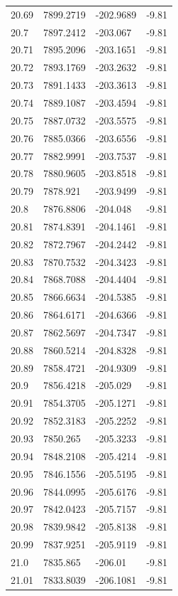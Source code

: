 \begin{table}[H]
\begin{tabular}{llll}
20.69 & 7899.2719 & -202.9689 & -9.81 \\
20.7 & 7897.2412 & -203.067 & -9.81 \\
20.71 & 7895.2096 & -203.1651 & -9.81 \\
20.72 & 7893.1769 & -203.2632 & -9.81 \\
20.73 & 7891.1433 & -203.3613 & -9.81 \\
20.74 & 7889.1087 & -203.4594 & -9.81 \\
20.75 & 7887.0732 & -203.5575 & -9.81 \\
20.76 & 7885.0366 & -203.6556 & -9.81 \\
20.77 & 7882.9991 & -203.7537 & -9.81 \\
20.78 & 7880.9605 & -203.8518 & -9.81 \\
20.79 & 7878.921 & -203.9499 & -9.81 \\
20.8 & 7876.8806 & -204.048 & -9.81 \\
20.81 & 7874.8391 & -204.1461 & -9.81 \\
20.82 & 7872.7967 & -204.2442 & -9.81 \\
20.83 & 7870.7532 & -204.3423 & -9.81 \\
20.84 & 7868.7088 & -204.4404 & -9.81 \\
20.85 & 7866.6634 & -204.5385 & -9.81 \\
20.86 & 7864.6171 & -204.6366 & -9.81 \\
20.87 & 7862.5697 & -204.7347 & -9.81 \\
20.88 & 7860.5214 & -204.8328 & -9.81 \\
20.89 & 7858.4721 & -204.9309 & -9.81 \\
20.9 & 7856.4218 & -205.029 & -9.81 \\
20.91 & 7854.3705 & -205.1271 & -9.81 \\
20.92 & 7852.3183 & -205.2252 & -9.81 \\
20.93 & 7850.265 & -205.3233 & -9.81 \\
20.94 & 7848.2108 & -205.4214 & -9.81 \\
20.95 & 7846.1556 & -205.5195 & -9.81 \\
20.96 & 7844.0995 & -205.6176 & -9.81 \\
20.97 & 7842.0423 & -205.7157 & -9.81 \\
20.98 & 7839.9842 & -205.8138 & -9.81 \\
20.99 & 7837.9251 & -205.9119 & -9.81 \\
21.0 & 7835.865 & -206.01 & -9.81 \\
21.01 & 7833.8039 & -206.1081 & -9.81 \\

\end{tabular}
\end{table}
